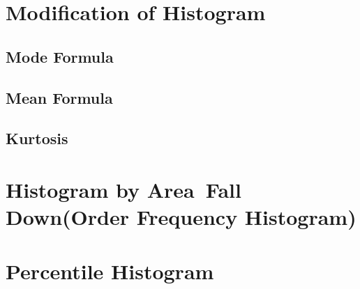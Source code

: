 \section{Modification  of Histogram} 
\subsection{Mode Formula}
\subsection{Mean Formula}
\subsection{Kurtosis}

\section{Histogram by Area\ Fall Down(Order Frequency Histogram)}

\section{Percentile Histogram}


\addblankpage %
